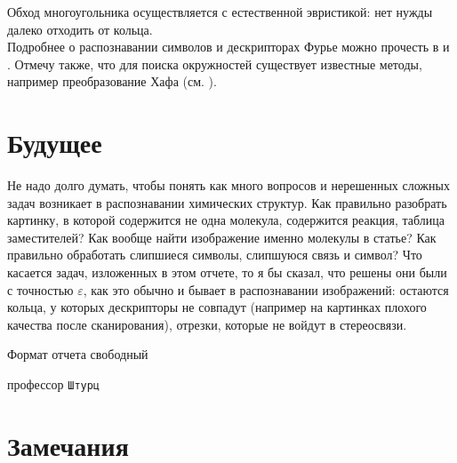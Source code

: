 \noindent
Обход многоугольника осуществляется с естественной эвристикой: нет нужды далеко отходить от кольца. \\ 
\noindent
Подробнее о распознавании символов
и дескрипторах Фурье можно прочесть в \cite{smolov} и \cite{zahn}. Отмечу также, что для поиска окружностей существует известные методы, 
например преобразование Хафа (см. \cite{gonzalez}).

\section*{Будущее}

Не надо долго думать, чтобы понять как много вопросов и нерешенных сложных задач возникает в распознавании химических структур. Как
правильно разобрать картинку, в которой содержится не одна молекула, содержится реакция, таблица заместителей? Как вообще
найти изображение именно молекулы в статье? Как правильно обработать слипшиеся символы, слипшуюся связь и символ? Что касается задач, изложенных
в этом отчете, то я бы сказал, что решены они были с точностью $\varepsilon$, как это обычно и бывает в распознавании изображений: остаются
кольца, у которых дескрипторы не совпадут (например на картинках плохого качества после сканирования), отрезки, которые не войдут в стереосвязи.

\onecolumn

\epigraph{Формат отчета свободный}{\tiny{профессор \tt{Штурц}}}

\section*{Замечания}


